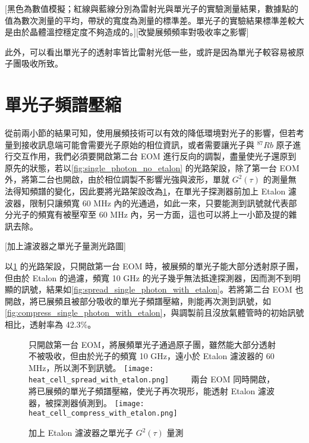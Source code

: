 \documentclass[class=NCU_thesis, crop=false]{standalone}
\begin{document}
[黑色為數值模擬；紅線與藍線分別為雷射光與單光子的實驗測量結果，數據點的值為數次測量的平均，帶狀的寬度為測量的標準差。單光子的實驗結果標準差較大是由於晶體溫控穩定度不夠造成的。][改變展頻頻率對吸收率之影響]

此外，可以看出單光子的透射率皆比雷射光低一些，或許是因為單光子較容易被原子團吸收所致。

\section{單光子頻譜壓縮}

從前兩小節的結果可知，使用展頻技術可以有效的降低環境對光子的影響，但若考量到接收訊息端可能會需要光子原始的相位資訊，或者需要讓光子與 $^{87}Rb$ 原子進行交互作用，我們必須要開啟第二台 EOM 進行反向的調製，盡量使光子還原到原先的狀態，若以\cref{fig:single_photon_no_etalon} 的光路架設，除了第一台 EOM 外，將第二台也開啟，由於相位調製不影響光強與波形，單就 $G^{2}(\tau)$ 的測量無法得知頻譜的變化，因此要將光路架設改為\cref{fig:single_photon_with_etalon}，在單光子探測器前加上 Etalon 濾波器，限制只讓頻寬 60 MHz 內的光通過，如此一來，只要能測到訊號就代表部分光子的頻寬有被壓窄至 60 MHz 內，另一方面，這也可以將上一小節及提的雜訊去除。

[加上濾波器之單光子量測光路圖]

以\cref{fig:single_photon_with_etalon} 的光路架設，只開啟第一台 EOM 時，被展頻的單光子能大部分透射原子團，但由於 Etalon 的過濾，頻寬 10 GHz 的光子幾乎無法抵達探測器，因而測不到明顯的訊號，結果如\cref{fig:spread_single_photon_with_etalon}。若將第二台 EOM 也開啟，將已展頻且被部分吸收的單光子頻譜壓縮，則能再次測到訊號，如\cref{fig:compress_single_photon_with_etalon}，與調製前且沒放氣體管時的初始訊號相比，透射率為 42.3\%。

\begin{figure}[!hbt]
    \centering
    \subcaptionbox
        {只開啟第一台 EOM，將展頻單光子通過原子團，雖然能大部分透射不被吸收，但由於光子的頻寬 10 GHz，遠小於 Etalon 濾波器的 60 MHz，所以測不到訊號。
        \label{fig:spread_single_photon_with_etalon}}
        {\texttt{[image: heat\_cell\_spread\_with\_etalon.png]}}
    ~~~~
    \subcaptionbox
        {兩台 EOM 同時開啟，將已展頻的單光子頻譜壓縮，使光子再次現形，能透射 Etalon 濾波器，被探測器偵測到。
        \label{fig:compress_single_photon_with_etalon}}
        {\texttt{[image: heat\_cell\_compress\_with\_etalon.png]}}
    \caption{加上 Etalon 濾波器之單光子 $G^{2}(\tau)$ 量測}
    \label{fig:single_photon_with_etalon}
\end{figure}
\end{document}
